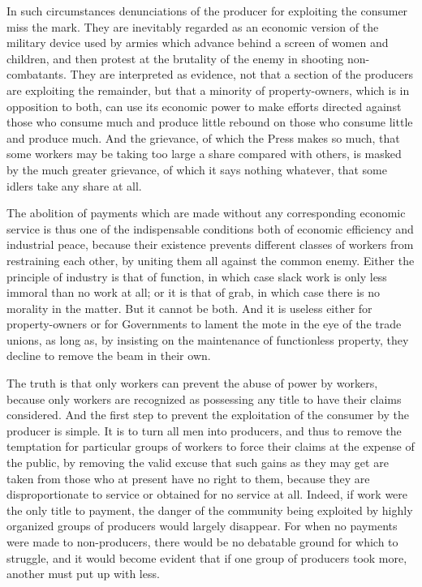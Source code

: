 \documentclass{book}
\begin{document}
In such circumstances denunciations of the producer for exploiting the consumer miss the mark. They are inevitably regarded as an economic version of the military device used by armies which advance behind a screen of women and children, and then protest at the brutality of the enemy in shooting non-combatants. They are interpreted as evidence, not that a section of the producers are exploiting the remainder, but that a minority of property-owners, which is in opposition to both, can use its economic power to make efforts directed against those who consume much and produce little rebound on those who consume little and produce much. And the grievance, of which the Press makes so much, that some workers may be taking too large a share compared with others, is masked by the much greater grievance, of which it says nothing whatever, that some idlers take any share at all.

The abolition of payments which are made without any corresponding economic service is thus one of the indispensable conditions both of economic efficiency and industrial peace, because their existence prevents different classes of workers from restraining each other, by uniting them all against the common enemy. Either the principle of industry is that of function, in which case slack work is only less immoral than no work at all; or it is that of grab, in which case there is no morality in the matter. But it cannot be both. And it is useless either for property-owners or for Governments to lament the mote in the eye of the trade unions, as long as, by insisting on the maintenance of functionless property, they decline to remove the beam in their own.

The truth is that only workers can prevent the abuse of power by workers, because only workers are recognized as possessing any title to have their claims considered. And the first step to prevent the exploitation of the consumer by the producer is simple. It is to turn all men into producers, and thus to remove the temptation for particular groups of workers to force their claims at the expense of the public, by removing the valid excuse that such gains as they may get are taken from those who at present have no right to them, because they are disproportionate to service or obtained for no service at all. Indeed, if work were the only title to payment, the danger of the community being exploited by highly organized groups of producers would largely disappear. For when no payments were made to non-producers, there would be no debatable ground for which to struggle, and it would become evident that if one group of producers took more, another must put up with less.
\end{document}
